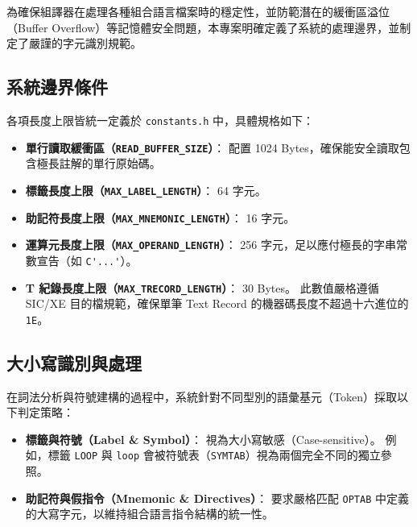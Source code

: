 為確保組譯器在處理各種組合語言檔案時的穩定性，並防範潛在的緩衝區溢位（Buffer Overflow）等記憶體安全問題，本專案明確定義了系統的處理邊界，並制定了嚴謹的字元識別規範。

\subsection{系統邊界條件}

各項長度上限皆統一定義於 \lstinline{constants.h} 中，具體規格如下：

\begin{itemize}
    \item \textbf{單行讀取緩衝區（\lstinline{READ_BUFFER_SIZE}）}：
          配置 1024 Bytes，確保能安全讀取包含極長註解的單行原始碼。
    \item \textbf{標籤長度上限（\lstinline{MAX_LABEL_LENGTH}）}：
          64 字元。
    \item \textbf{助記符長度上限（\lstinline{MAX_MNEMONIC_LENGTH}）}：
          16 字元。
    \item \textbf{運算元長度上限（\lstinline{MAX_OPERAND_LENGTH}）}：
          256 字元，足以應付極長的字串常數宣告（如 \lstinline{C'...'}）。
    \item \textbf{T 紀錄長度上限（\lstinline{MAX_TRECORD_LENGTH}）}：
          30 Bytes。
          此數值嚴格遵循 SIC/XE 目的檔規範，確保單筆 Text Record 的機器碼長度不超過十六進位的 \lstinline{1E}。
\end{itemize}

\subsection{大小寫識別與處理}

在詞法分析與符號建構的過程中，系統針對不同型別的語彙基元（Token）採取以下判定策略：

\begin{itemize}
    \item \textbf{標籤與符號（Label \& Symbol）}：
          視為大小寫敏感（Case-sensitive）。
          例如，標籤 \lstinline{LOOP} 與 \lstinline{loop} 會被符號表（\lstinline{SYMTAB}）視為兩個完全不同的獨立參照。
    \item \textbf{助記符與假指令（Mnemonic \& Directives）}：
          要求嚴格匹配 \lstinline{OPTAB} 中定義的大寫字元，以維持組合語言指令結構的統一性。
\end{itemize}